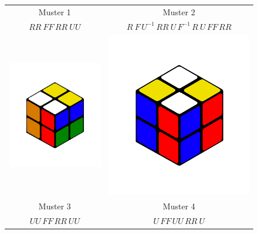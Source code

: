 \documentclass[12pt,a4paper, usenames, dvipsnames]{article}
\begin{document}
\begin{figure}[h]
\begin{tabular}{cc}
Muster 1 & Muster 2 \\
$RR \ FF \, RR \ UU$ &  $R \ F \, U^{-1} \, RR \ U \, F^{-1} \, R \ U \, FF \, RR$ \\
\includegraphics[scale=0.1]{UUFFRRUU.png} &  \includegraphics[scale=0.1]{UFFUURRU.png} \\
Muster 3 & Muster 4 \\
$UU \, FF \, RR \ UU$ &  $U \, FF \, UU \, RR \ U$ \\
\end{tabular}


\end{figure}
\end{document}
